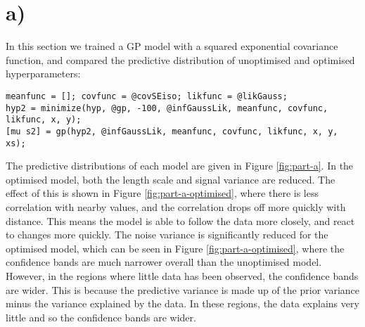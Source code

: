 \documentclass[11pt]{report}
\begin{document}
\begin{comment}
\begin{titlepage}
	\begin{center}
        \vspace*{1cm}
            
        \Huge
        \textbf{4F13 Coursework 1 Report}
            
        \vspace{0.5cm}
        \LARGE
        Gaussian Processes
            
        \vspace{3.5cm}
            
       \textbf{Rory Highnam}\\
        \vspace{0.5cm}
        rjh248\\
        \vspace{0.5cm}
        Magdalene college
            
        \vfill
            
        \vspace{0.8cm}
            
            
        \Large
       17/10/2021
            
    \end{center}
\end{titlepage}
\end{comment}

\section*{a) }

In this section we trained a GP model with a squared exponential covariance function, and compared the predictive distribution of unoptimised and optimised hyperparameters:
\begin{lstlisting}[basicstyle=\listingsfont]
meanfunc = []; covfunc = @covSEiso; likfunc = @likGauss;
hyp2 = minimize(hyp, @gp, -100, @infGaussLik, meanfunc, covfunc, likfunc, x, y);
[mu s2] = gp(hyp2, @infGaussLik, meanfunc, covfunc, likfunc, x, y, xs);
\end{lstlisting}
The predictive distributions of each model are given in Figure \ref{fig:part-a}. In the optimised model, both the length scale and signal variance are reduced. The effect of this is shown in Figure \ref{fig:part-a-optimised}, where there is less correlation with nearby values, and the correlation drops off more quickly with distance. This means the model is able to follow the data more closely, and react to changes more quickly. The noise variance is significantly reduced for the optimised model, which can be seen in Figure \ref{fig:part-a-optimised}, where the confidence bands are much narrower overall than the unoptimised model. However, in the regions where little data has been observed, the confidence bands are wider. This is because the predictive variance is made up of the prior variance minus the variance explained by the data. In these regions, the data explains very little and so the confidence bands are wider.
\end{document}

